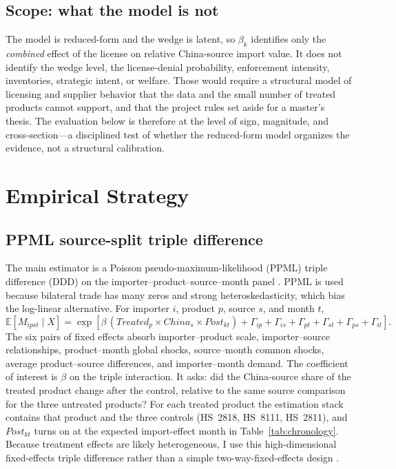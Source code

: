 \documentclass[12pt,a4paper]{article}
\begin{document}
\subsection{Scope: what the model is not}\label{sec:scope}

The model is reduced-form and the wedge is latent, so $\beta_k$ identifies only
the \emph{combined} effect of the license on relative China-source import value. It does not
identify the wedge level, the license-denial probability, enforcement intensity,
inventories, strategic intent, or welfare. Those would require a structural model
of licensing and supplier behavior that the data and the small number of treated
products cannot support, and that the project rules set aside for a master's
thesis. The evaluation below is therefore at the level of sign, magnitude, and
cross-section---a disciplined test of whether the reduced-form model organizes
the evidence, not a structural calibration.

\section{Empirical Strategy}\label{sec:strategy}

\subsection{PPML source-split triple difference}\label{sec:ddd}

The main estimator is a Poisson pseudo-maximum-likelihood (PPML) triple
difference (DDD) on the importer--product--source--month panel
\citep{santossilva2006gravity}. PPML is used because bilateral trade has many
zeros and strong heteroskedasticity, which bias the log-linear alternative. For
importer $i$, product $p$, source $s$, and month $t$,
\begin{equation}
\mathbb{E}[M_{ipst}\mid X]=
\exp\!\left[\beta\,(\mathit{Treated}_{p}\times \mathit{China}_{s}\times \mathit{Post}_{kt})
+\Gamma_{ip}+\Gamma_{is}+\Gamma_{pt}+\Gamma_{st}+\Gamma_{ps}+\Gamma_{it}\right].
\label{eq:ppml}
\end{equation}
The six pairs of fixed effects absorb importer--product scale, importer--source
relationships, product--month global shocks, source--month common shocks, average
product--source differences, and importer--month demand. The coefficient of
interest is $\beta$ on the triple interaction. It asks: did the China-source
share of the treated product change after the control, relative to the same
source comparison for the three untreated products? For each treated product the
estimation stack contains that product and the three controls (HS~2818, HS~8111,
HS~2811), and $\mathit{Post}_{kt}$ turns on at the expected import-effect month
in Table~\ref{tab:chronology}. Because treatment effects are likely
heterogeneous, I use this high-dimensional fixed-effects triple difference
rather than a simple two-way-fixed-effects design
\citep{dechaisemartindhaultfoeuille-2020-twowayfixedeffects}.
\end{document}
